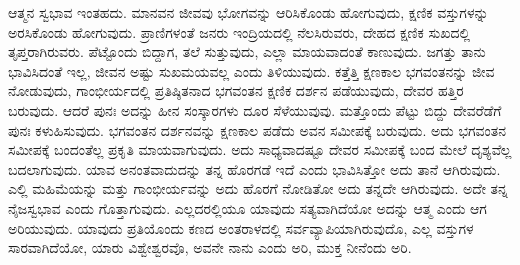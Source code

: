 ಆತ್ಮನ ಸ್ವಭಾವ ಇಂತಹದು. ಮಾನವನ ಜೀವವು ಭೋಗವನ್ನು ಆರಿಸಿಕೊಂಡು ಹೋಗುವುದು, ಕ್ಷಣಿಕ ವಸ್ತುಗಳನ್ನು ಅರಸಿಕೊಂಡು ಹೋಗುವುದು. ಪ್ರಾಣಿಗಳಂತೆ ಜನರು ಇಂದ್ರಿಯದಲ್ಲಿ ನೆಲಸಿರುವರು, ದೇಹದ ಕ್ಷಣಿಕ ಸುಖದಲ್ಲಿ ತೃಪ್ತರಾಗಿರುವರು. ಪೆಟ್ಟೊಂದು ಬಿದ್ದಾಗ, ತಲೆ ಸುತ್ತುವುದು, ಎಲ್ಲಾ ಮಾಯವಾದಂತೆ ಕಾಣುವುದು. ಜಗತ್ತು ತಾನು ಭಾವಿಸಿದಂತೆ ಇಲ್ಲ, ಜೀವನ ಅಷ್ಟು ಸುಖಮಯವಲ್ಲ ಎಂದು ತಿಳಿಯುವುದು. ಕತ್ತೆತ್ತಿ ಕ್ಷಣಕಾಲ ಭಗವಂತನನ್ನು ಜೀವ ನೋಡುವುದು, ಗಾಂಭೀರ್ಯದಲ್ಲಿ ಪ್ರತಿಷ್ಠಿತನಾದ ಭಗವಂತನ ಕ್ಷಣಿಕ ದರ್ಶನ ಪಡೆಯುವುದು, ದೇವರ ಹತ್ತಿರ ಬರುವುದು. ಆದರೆ ಪುನಃ ಅದನ್ನು ಹೀನ ಸಂಸ್ಕಾರಗಳು ದೂರ ಸೆಳೆಯುವುವು. ಮತ್ತೊಂದು ಪೆಟ್ಟು ಬಿದ್ದು ದೇವರೆಡೆಗೆ ಪುನಃ ಕಳುಹಿಸುವುದು. ಭಗವಂತನ ದರ್ಶನವನ್ನು ಕ್ಷಣಕಾಲ ಪಡೆದು ಅವನ ಸಮೀಪಕ್ಕೆ ಬರುವುದು. ಅದು ಭಗವಂತನ ಸಮೀಪಕ್ಕೆ ಬಂದಂತೆಲ್ಲ ಪ್ರಕೃತಿ ಮಾಯವಾಗುವುದು. ಅದು ಸಾಧ್ಯವಾದಷ್ಟೂ ದೇವರ ಸಮೀಪಕ್ಕೆ ಬಂದ ಮೇಲೆ ದೃಶ್ಯವೆಲ್ಲ ಬದಲಾಗುವುದು. ಯಾವ ಅನಂತವಾದುದನ್ನು ತನ್ನ ಹೊರಗಡೆ ಇದೆ ಎಂದು ಭಾವಿಸಿತ್ತೋ ಅದು ತಾನೆ ಆಗಿರುವುದು. ಎಲ್ಲಿ ಮಹಿಮೆಯನ್ನು ಮತ್ತು ಗಾಂಭೀರ್ಯವನ್ನು ಅದು ಹೊರಗೆ ನೋಡಿತೋ ಅದು ತನ್ನದೇ ಆಗಿರುವುದು. ಅದೇ ತನ್ನ ನೈಜಸ್ವಭಾವ ಎಂದು ಗೊತ್ತಾಗುವುದು. ಎಲ್ಲದರಲ್ಲಿಯೂ ಯಾವುದು ಸತ್ಯವಾಗಿದೆಯೋ ಅದನ್ನು ಆತ್ಮ ಎಂದು ಆಗ ಅರಿಯುವುದು. ಯಾವುದು ಪ್ರತಿಯೊಂದು ಕಣದ ಅಂತರಾಳದಲ್ಲಿ ಸರ್ವವ್ಯಾಪಿಯಾಗಿರುವುದೊ, ಎಲ್ಲ ವಸ್ತುಗಳ ಸಾರವಾಗಿದೆಯೋ, ಯಾರು ವಿಶ್ವೇಶ್ವರವೊ, ಅವನೇ ನಾನು ಎಂದು ಅರಿ, ಮುಕ್ತ ನೀನೆಂದು ಅರಿ.

